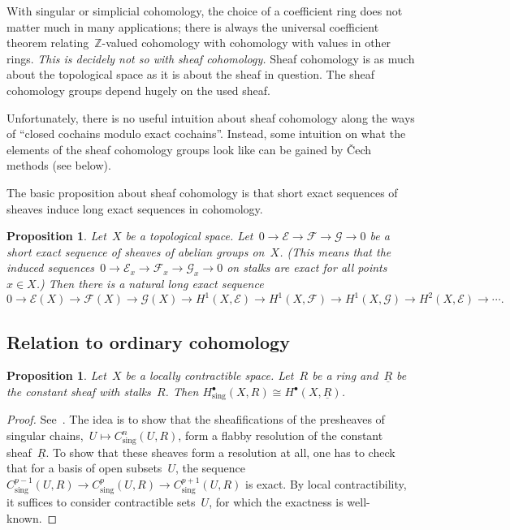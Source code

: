 \documentclass[10pt]{amsart}
\theoremstyle{definition}
\theoremstyle{plain}
\newtheorem{prop}[defn]{Proposition}
\theoremstyle{remark}
\newcommand{\E}{\mathcal{E}}
\newcommand{\F}{\mathcal{F}}
\newcommand{\G}{\mathcal{G}}
\newcommand{\ZZ}{\mathbb{Z}}
\begin{document}
With singular or simplicial cohomology, the choice of a coefficient ring does
not matter much in many applications; there is always the universal coefficient
theorem relating~$\ZZ$-valued cohomology with cohomology with values in other
rings. \emph{This is decidely not so with sheaf cohomology.} Sheaf cohomology
is as much about the topological space as it is about the sheaf in question.
The sheaf cohomology groups depend hugely on the used sheaf.

Unfortunately, there is no useful intuition about sheaf cohomology along the
ways of ``closed cochains modulo exact cochains''. Instead, some intuition on
what the elements of the sheaf cohomology groups look like can be gained by
Čech methods (see below).

The basic proposition about sheaf cohomology is that short exact sequences of
sheaves induce long exact sequences in cohomology.

\begin{prop}Let~$X$ be a topological space. Let~$0 \to \E \to \F \to \G \to 0$
be a short exact sequence of sheaves of abelian groups on~$X$. (This means that
the induced sequences~$0 \to \E_x \to \F_x \to \G_x \to 0$ on stalks are exact
for all points~$x \in X$.) Then there is a natural long exact sequence
\[ 0 \to \E(X) \to \F(X) \to \G(X) \to
  H^1(X,\E) \to H^1(X,\F) \to H^1(X,\G) \to H^2(X,\E) \to \cdots. \]
\end{prop}


\subsection{Relation to ordinary cohomology}

\begin{prop}Let~$X$ be a locally contractible space. Let~$R$ be a ring
and~$\underline{R}$ be the constant sheaf with stalks~$R$. Then
$H^\bullet_\text{sing}(X, R) \cong H^\bullet(X, \underline{R})$.
\end{prop}
\begin{proof}See~\cite{cibotaru}. The idea is to show that the sheafifications
of the presheaves of singular chains,~$U \mapsto C^n_\text{sing}(U,R)$, form a
flabby resolution of the constant sheaf~$\underline{R}$. To show that these
sheaves form a resolution at all, one has to check that for a basis of open
subsets~$U$, the sequence~$C^{p-1}_\text{sing}(U,R) \to C^p_\text{sing}(U,R)
\to C^{p+1}_\text{sing}(U,R)$ is exact. By local contractibility, it suffices
to consider contractible sets~$U$, for which the exactness is well-known.
\end{proof}
\end{document}
